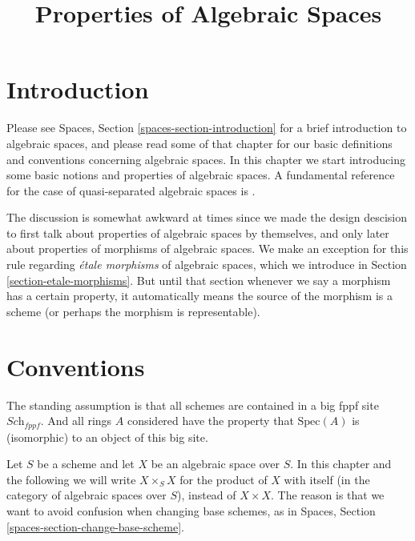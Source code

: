 

%


\title{Properties of Algebraic Spaces}


\maketitle

\label{section-phantom}

\tableofcontents

\section{Introduction}
\label{section-introduction}

\noindent
Please see Spaces, Section \ref{spaces-section-introduction}
for a brief introduction to algebraic spaces, and please read
some of that chapter for our basic definitions and conventions
concerning algebraic spaces. In this chapter we start introducing
some basic notions and properties of algebraic spaces. A fundamental
reference for the case of quasi-separated algebraic spaces is
\cite{Kn}.

\medskip\noindent
The discussion is somewhat awkward at times since we made the design
descision to first talk about properties of algebraic spaces by
themselves, and only later about properties of morphisms of algebraic
spaces. We make an exception for this rule regarding
{\it \'etale morphisms} of algebraic spaces, which we introduce in
Section \ref{section-etale-morphisms}. But until that section whenever
we say a morphism has a certain property, it automatically means the
source of the morphism is a scheme (or perhaps the morphism is representable).



\section{Conventions}
\label{section-conventions}

\noindent
The standing assumption is that all schemes are contained in
a big fppf site $\textit{Sch}_{fppf}$. And all rings $A$ considered
have the property that $\text{Spec}(A)$ is (isomorphic) to an
object of this big site.

\medskip\noindent
Let $S$ be a scheme and let $X$ be an algebraic space over $S$.
In this chapter and the following we will write $X \times_S X$
for the product of $X$ with itself (in the category of algebraic
spaces over $S$), instead of $X \times X$. The reason is that we
want to avoid confusion when changing base schemes, as in
Spaces, Section \ref{spaces-section-change-base-scheme}.


